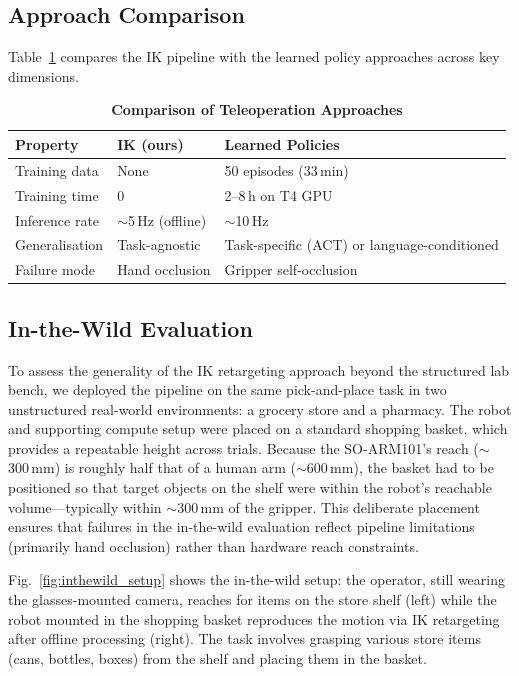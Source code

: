 \documentclass{ieeeaccess}
\begin{document}
\subsection{Approach Comparison}

Table~\ref{tab:comparison} compares the IK pipeline with the learned
policy approaches across key dimensions.

\begin{table}[t]
\caption{\textbf{Comparison of Teleoperation Approaches}}
\label{tab:comparison}
\centering
\begin{tabular}{p{1.8cm}p{1.4cm}p{3.5cm}}
\hline
\textbf{Property} & \textbf{IK (ours)} & \textbf{Learned Policies} \\
\hline
Training data
  & None
  & 50 episodes (33\,min) \\
Training time
  & 0
  & 2--8\,h on T4 GPU \\
Inference rate
  & ${\sim}$5\,Hz (offline)
  & ${\sim}$10\,Hz \\
Generalisation
  & Task-agnostic
  & Task-specific (ACT) or language-conditioned \\
Failure mode
  & Hand occlusion
  & Gripper self-occlusion \\
\hline
\end{tabular}
\end{table}

\subsection{In-the-Wild Evaluation}
\label{sec:inthewild}

To assess the generality of the IK retargeting approach beyond the
structured lab bench, we deployed the pipeline on the same pick-and-place
task in two unstructured real-world environments: a grocery store and a
pharmacy. The robot and supporting compute setup were placed on a
standard shopping basket, which provides a repeatable height across
trials. Because the SO-ARM101's reach (${\sim}$300\,mm) is roughly half
that of a human arm (${\sim}$600\,mm), the basket had to be positioned
so that target objects on the shelf were within the robot's reachable
volume---typically within ${\sim}$300\,mm of the gripper. This
deliberate placement ensures that failures in the in-the-wild
evaluation reflect pipeline limitations (primarily hand occlusion)
rather than hardware reach constraints.

Fig.~\ref{fig:inthewild_setup} shows the in-the-wild setup: the
operator, still wearing the glasses-mounted camera, reaches for items
on the store shelf (left) while the robot
mounted in the shopping basket reproduces the motion via IK retargeting
after offline processing (right). The task involves grasping various
store items (cans, bottles, boxes) from the shelf and placing them in
the basket.
\end{document}
